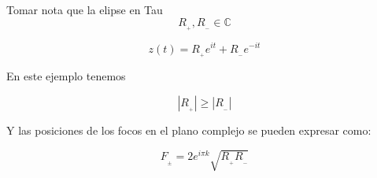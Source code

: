 \documentclass[preview]{standalone}
\begin{document}
\begin{center}
Tomar nota que la elipse en Tau 
$$ R_{_+} , R_{_-} \in \mathbb{C}$$  

$$z(t)=R_{_+} e^{it} +R_{_-} e^{-it}$$ 


En este ejemplo tenemos 

$$|R_{_+}|\geq|R_{_-}|$$ 

Y las posiciones de los focos en el plano complejo se pueden expresar como:

$$F_{_{\pm}}=2 e^{i\pi k} \sqrt{R_{_+}R_{_-}}$$
\end{center}
\end{document}
